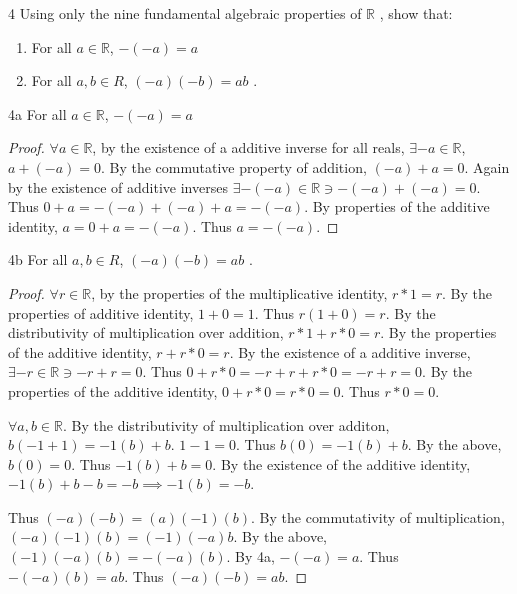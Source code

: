 \documentclass{article}
\newcommand{\R}{\mathbb{R}}
\begin{document}
\begin{PROB}{4}\label{Problem 4.}
    Using only the nine fundamental algebraic properties of $\R$ , show that:

    \begin{enumerate}
        \item For all $a \in \R$, $-(-a) = a$
        \item For all $a, b \in R$, $(-a)(-b) = ab$ .  
    \end{enumerate}
     
\end{PROB}
\begin{claim}{4a}\label{Claim 4a.}
    For all $a \in \R$, $-(-a) = a$
\end{claim}
\begin{proof}
    $\forall a \in \R$, by the existence of a additive inverse for all reals, $\exists -a \in \R$, $a + (-a) = 0$. By the commutative property of addition, $(-a) + a =0$. Again by the existence of additive inverses $\exists -(-a) \in \R \ni -(-a) + (-a) = 0$. Thus $0 + a = -(-a) + (-a) + a = -(-a)$. By properties of the additive identity, $a = 0 + a = -(-a)$. Thus $a = -(-a)$.         
\end{proof}
\begin{claim}{4b}\label{Claim 4b.}
    For all $a, b \in R$, $(-a)(-b) = ab$ .
\end{claim}
\begin{proof}
$\forall r \in \R$, by the properties of the multiplicative identity, $r * 1 = r$. By the properties of additive identity, $1 + 0 = 1$. Thus $r(1 + 0) = r$. By the distributivity of multiplication over addition, $r*1 + r*0 = r$. By the properties of the additive identity, $r + r*0 = r$. By the existence of a additive inverse, $\exists -r \in \R \ni -r + r = 0$. Thus $0 + r*0 = -r + r + r*0 = -r + r = 0$. By the properties of the additive identity, $0 + r*0 = r*0 =0$. Thus $r*0 = 0$.      

$\forall a, b \in \R$. By the distributivity of multiplication over additon, $b(-1 + 1) = -1(b) + b$. $1 - 1= 0$. Thus $b(0) = -1(b) + b$. By the above, $b(0) = 0$. Thus $-1(b) + b = 0$. By the existence of the additive identity, $-1(b) + b -b = -b \implies -1(b) = -b$. 

Thus $(-a)(-b) = (a)(-1)(b)$. By the commutativity of multiplication, $(-a)(-1)(b) = (-1)(-a)b$. By the above, $(-1)(-a)(b) = -(-a)(b)$. By 4a, $-(-a) = a$. Thus $-(-a)(b) = ab$. Thus $(-a)(-b) = ab$.           
\end{proof}
\end{document}
